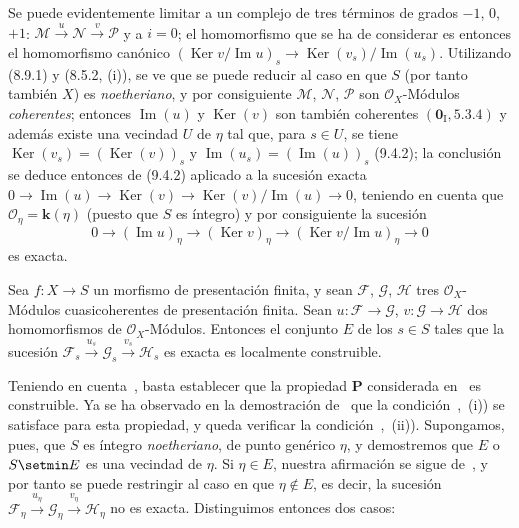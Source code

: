 
Se puede evidentemente limitar a un complejo de tres términos de grados
$-1$, $0$, $+1$:
$\mathcal M\xrightarrow{u}\mathcal N\xrightarrow{v}\mathcal P$
y a $i=0$; el homomorfismo que se ha de considerar es entonces el homomorfismo canónico
$(\operatorname{Ker}v/\operatorname{Im}u)_s\to
\operatorname{Ker}(v_s)/\operatorname{Im}(u_s)$. Utilizando (8.9.1) y
(8.5.2, (i)), se ve que se puede reducir al caso en que $S$ (por tanto también $X$)
es \emph{noetheriano}, y por consiguiente $\mathcal M$, $\mathcal N$, $\mathcal P$
son $\mathcal O_X$-Módulos \emph{coherentes}; entonces
$\operatorname{Im}(u)$ y $\operatorname{Ker}(v)$ son también coherentes
$(\mathbf 0_{\mathrm I},5.3.4)$ y además existe una vecindad $U$ de
$\eta$ tal que, para $s\in U$, se tiene
$\operatorname{Ker}(v_s)=(\operatorname{Ker}(v))_s$ y
$\operatorname{Im}(u_s)=(\operatorname{Im}(u))_s$ (9.4.2); la conclusión
se deduce entonces de (9.4.2) aplicado a la sucesión exacta
$0\to\operatorname{Im}(u)\to\operatorname{Ker}(v)\to
\operatorname{Ker}(v)/\operatorname{Im}(u)\to0$,
teniendo en cuenta que $\mathcal O_\eta=\boldsymbol{k}(\eta)$ (puesto que $S$ es íntegro) y
por consiguiente la sucesión
\[
0\to(\operatorname{Im}u)_\eta\to(\operatorname{Ker}v)_\eta\to
(\operatorname{Ker}v/\operatorname{Im}u)_\eta\to0
\]
es exacta.

\begin{proposition}[9.4.4]
\label{IV.9.4.4}
Sea $f:X\to S$ un morfismo de presentación finita, y sean $\mathcal F$, $\mathcal G$, $\mathcal H$ tres $\mathcal O_X$-Módulos cuasicoherentes de presentación finita.
Sean $u:\mathcal F\to\mathcal G$, $v:\mathcal G\to\mathcal H$ dos homomorfismos de $\mathcal O_X$-Módulos.
Entonces el conjunto $E$ de los $s\in S$ tales que la sucesión $\mathcal F_s\xrightarrow{u_s}\mathcal G_s
\xrightarrow{v_s}\mathcal H_s$ es exacta es localmente construible.
\end{proposition}

Teniendo en cuenta~, basta establecer que la propiedad $\boldsymbol{P}$ considerada en~ es construible.
Ya se ha observado en la demostración de~ que la condición~,~(i)) se satisface para esta propiedad, y queda verificar la condición~,~(ii)).
Supongamos, pues, que $S$ es íntegro \emph{noetheriano}, de punto genérico $\eta$, y demostremos que $E$ o $S\setmin E$ es una vecindad de $\eta$.
Si $\eta\in E$, nuestra afirmación se sigue de~, y por tanto se puede restringir al caso en que $\eta\notin E$, es decir, la sucesión $\mathcal F_\eta\xrightarrow{u_\eta}\mathcal G_\eta
\xrightarrow{v_\eta}\mathcal H_\eta$ no es exacta.
Distinguimos entonces dos casos:

